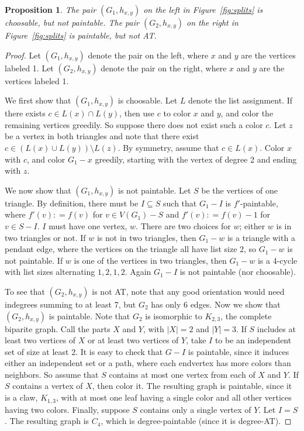 \documentclass[12pt]{article}
\theoremstyle{plain}
\newtheorem{prop}[thm]{Proposition}
\theoremstyle{definition}
\theoremstyle{remark}
\newcommand{\DefinedAs}{\mathrel{\mathop:}=}
\begin{document}
	\begin{prop}
		The pair $(G_1,h_{x,y})$ on the left in Figure~\ref{fig:splits} is choosable,
		but not paintable.  The pair $(G_2,h_{x,y})$ on the right in
		Figure~\ref{fig:splits} is paintable, but not AT.
	\end{prop}
	\begin{proof}
		Let $(G_1,h_{x,y})$ denote the pair on the left, where $x$ and $y$ are the
		vertices labeled 1.  Let $(G_2,h_{x,y})$ denote the pair on the right, where
		$x$ and $y$ are the vertices labeled 1.
		
		We first show that $(G_1,h_{x,y})$ is choosable.  Let $L$ denote the list
		assignment.  If there exists $c\in L(x)\cap L(y)$, then use $c$ to color $x$ and
		$y$, and color the remaining vertices greedily.  So suppose there does not
		exist such a color $c$.  Let $z$ be a vertex in both triangles and note that
		there exist $c\in (L(x)\cup L(y))\setminus L(z)$.  By symmetry, assume that
		$c\in L(x)$.  Color $x$ with $c$, and color $G_1-x$ greedily, starting with the
		vertex of degree 2 and ending with $z$.
		
		We now show that $(G_1,h_{x,y})$ is not paintable. Let $S$ be the vertices of one 
		triangle.  By definition, there must be $I \subseteq S$ such that $G_1-I$ is 
		$f'$-paintable, where $f'(v) \DefinedAs f(v)$ for $v \in V(G_1) - S$ and $f'(v)
		\DefinedAs f(v) - 1$ for $v \in S - I$.  $I$ must have one vertex, $w$.  There
		are two choices for $w$; either $w$ is in two triangles or not.  If $w$ is not
		in two triangles, then $G_1 - w$ is a triangle with a pendant edge, where
		the vertices on the triangle all have list size 2, so $G_1-w$ is not paintable.
		If $w$ is one of the vertices in two triangles, then $G_1-w$ is a 4-cycle with
		list sizes alternating $1, 2, 1, 2$.  Again $G_1-I$ is not paintable (nor choosable).
		
		To see that $(G_2,h_{x,y})$ is not AT, note that any good orientation would need
		indegrees summing to at least 7, but $G_2$ has only 6 edges.  Now we show that
		$(G_2,h_{x,y})$ is paintable.  Note that $G_2$ is isomorphic to $K_{2,3}$, the complete
		biparite graph.  Call the parts $X$ and $Y$, with $|X|=2$ and $|Y|=3$.  If $S$
		includes at least two vertices of $X$ or at least two vertices of $Y$, take $I$
		to be an independent set of size at least 2.  It is easy to check that $G-I$ is
		paintable, since it induces either an independent set or a path, where each
		endvertex has more colors than neighbors.  So assume that $S$ contains at most
		one vertex from each of $X$ and $Y$.  If $S$ contains a vertex of $X$, then
		color it.  The resulting graph is paintable, since it is a claw, $K_{1,3}$,
		with at most one leaf having a single color and all other vertices having two
		colors.  Finally, suppose $S$ contains only a single vertex of $Y$. Let $I=S$. 
		The resulting graph is $C_4$, which is degree-paintable (since it is degree-AT).
	\end{proof}
	
\end{document}
